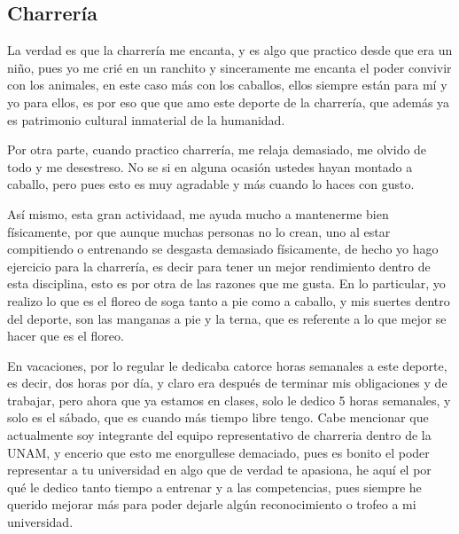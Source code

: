 \documentclass[letterpaper,12pt]{article}
\begin{document}
    \subsection{\Large{Charrería}} \large{La verdad es que la charrería me encanta, y es algo que practico desde que era un niño, pues yo me crié en un ranchito y sinceramente me encanta el poder convivir con los animales, en este caso más con los caballos, ellos siempre están para mí y yo para ellos, es por eso que que amo este deporte de la charrería, que además ya es patrimonio cultural inmaterial de la humanidad.
    
    Por otra parte, cuando practico charrería, me relaja demasiado, me olvido de todo y me desestreso. No se si en alguna ocasión ustedes hayan montado a caballo, pero pues esto es muy agradable y más cuando lo haces con gusto.
    
    Así mismo, esta gran actividaad, me ayuda mucho a mantenerme bien físicamente, por que aunque muchas personas no lo crean, uno al estar compitiendo o entrenando se desgasta demasiado físicamente, de hecho yo hago ejercicio para la charrería, es decir para tener un mejor rendimiento dentro de esta disciplina, esto es por otra de las razones que me gusta. En lo particular, yo realizo lo que es el floreo de soga tanto a pie como a caballo, y mis suertes dentro del deporte, son las manganas a pie y la terna, que es referente a lo que mejor se hacer que es el floreo.
    
    En vacaciones, por lo regular le dedicaba catorce horas semanales a este deporte, es decir, dos horas por día, y claro era después de terminar mis obligaciones y de trabajar, pero ahora que ya estamos en clases, solo le dedico 5 horas semanales, y solo es el sábado, que es cuando más tiempo libre tengo. Cabe mencionar que actualmente soy integrante del equipo representativo de charreria dentro de la UNAM, y encerio que esto me enorgullese demaciado, pues es bonito el poder representar a tu universidad en algo que de verdad te apasiona, he aquí el por qué le dedico tanto tiempo a entrenar y a las competencias, pues siempre he querido mejorar más para poder dejarle algún reconocimiento o trofeo a mi universidad.} 

          
\end{document}
